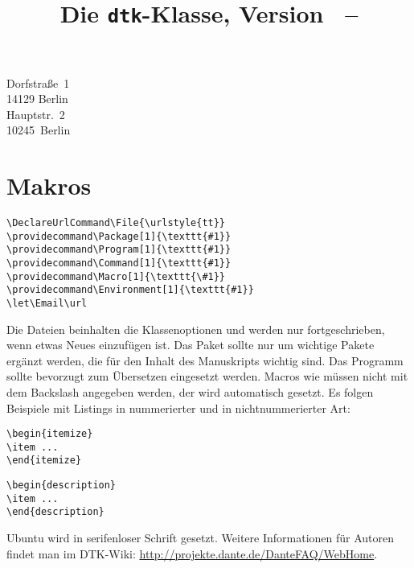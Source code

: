 \documentclass[ngerman]{dtk}
\begin{document}
\title{Die \texttt{dtk}-Klasse, Version \DTKversion\ -- \DTKversiondate}
%
    {Dorfstraße~1\\
     14129 Berlin\\
     }
%
    {Hauptstr.~2\\
     10245~Berlin\\
     }
\maketitle

\section{Makros}

\begin{verbatim}
\DeclareUrlCommand\File{\urlstyle{tt}}
\providecommand\Package[1]{\texttt{#1}}
\providecommand\Program[1]{\texttt{#1}}
\providecommand\Command[1]{\texttt{#1}}
\providecommand\Macro[1]{\texttt{\#1}}
\providecommand\Environment[1]{\texttt{#1}}
\let\Email\url
\end{verbatim}

Die Dateien  beinhalten die Klassenoptionen und
werden nur fortgeschrieben, wenn etwas Neues einzufügen ist. Das Paket
 sollte nur um wichtige Pakete ergänzt werden, die für den Inhalt
des Manuskripts wichtig sind. Das Programm  sollte bevorzugt
zum Übersetzen eingesetzt werden. Macros wie  müssen nicht mit
dem Backslash angegeben werden, der wird automatisch gesetzt. Es folgen
Beispiele mit Listings in nummerierter und in nichtnummerierter Art:

\begin{lstlisting}[style=number]
\begin{itemize}
\item ...
\end{itemize}
\end{lstlisting}

\begin{lstlisting}[style=noNumber]
\begin{description}
\item ...
\end{description}
\end{lstlisting}

\textsf{Ubuntu} wird in serifenloser Schrift gesetzt.
Weitere Informationen für Autoren findet man im DTK-Wiki:
\url{http://projekte.dante.de/DanteFAQ/WebHome}.
\end{document}
